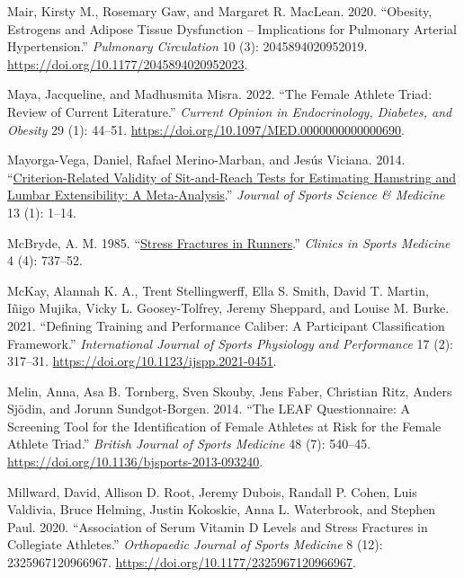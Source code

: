 \documentclass[
]{article}
\newlength{\cslhangindent}
\newenvironment{CSLReferences}[2] %
 {\begin{list}{}{%
  \setlength{\itemindent}{0pt}
  \setlength{\leftmargin}{0pt}
  \setlength{\parsep}{0pt}
  \ifodd #1
   \setlength{\leftmargin}{\cslhangindent}
   \setlength{\itemindent}{-1\cslhangindent}
  \fi
  \setlength{\itemsep}{#2\baselineskip}}}
 {\end{list}}
\begin{document}
\begin{CSLReferences}{1}{0}
Mair, Kirsty M., Rosemary Gaw, and Margaret R. MacLean. 2020. {``Obesity, Estrogens and Adipose Tissue Dysfunction -- Implications for Pulmonary Arterial Hypertension.''} \emph{Pulmonary Circulation} 10 (3): 2045894020952019. \url{https://doi.org/10.1177/2045894020952023}.

Maya, Jacqueline, and Madhusmita Misra. 2022. {``The {Female} {Athlete} {Triad}: {Review} of {Current} {Literature}.''} \emph{Current Opinion in Endocrinology, Diabetes, and Obesity} 29 (1): 44--51. \url{https://doi.org/10.1097/MED.0000000000000690}.

Mayorga-Vega, Daniel, Rafael Merino-Marban, and Jesús Viciana. 2014. {``\href{https://www.ncbi.nlm.nih.gov/pmc/articles/PMC3918544}{Criterion-{Related} {Validity} of {Sit}-and-{Reach} {Tests} for {Estimating} {Hamstring} and {Lumbar} {Extensibility}: A {Meta}-{Analysis}}.''} \emph{Journal of Sports Science \& Medicine} 13 (1): 1--14.

McBryde, A. M. 1985. {``\href{https://www.ncbi.nlm.nih.gov/pubmed/4053198}{Stress Fractures in Runners}.''} \emph{Clinics in Sports Medicine} 4 (4): 737--52.

McKay, Alannah K. A., Trent Stellingwerff, Ella S. Smith, David T. Martin, Iñigo Mujika, Vicky L. Goosey-Tolfrey, Jeremy Sheppard, and Louise M. Burke. 2021. {``Defining {Training} and {Performance} {Caliber}: {A} {Participant} {Classification} {Framework}.''} \emph{International Journal of Sports Physiology and Performance} 17 (2): 317--31. \url{https://doi.org/10.1123/ijspp.2021-0451}.

Melin, Anna, Asa B. Tornberg, Sven Skouby, Jens Faber, Christian Ritz, Anders Sjödin, and Jorunn Sundgot-Borgen. 2014. {``The {LEAF} Questionnaire: A Screening Tool for the Identification of Female Athletes at Risk for the Female Athlete Triad.''} \emph{British Journal of Sports Medicine} 48 (7): 540--45. \url{https://doi.org/10.1136/bjsports-2013-093240}.

Millward, David, Allison D. Root, Jeremy Dubois, Randall P. Cohen, Luis Valdivia, Bruce Helming, Justin Kokoskie, Anna L. Waterbrook, and Stephen Paul. 2020. {``Association of {Serum} {Vitamin} {D} {Levels} and {Stress} {Fractures} in {Collegiate} {Athletes}.''} \emph{Orthopaedic Journal of Sports Medicine} 8 (12): 2325967120966967. \url{https://doi.org/10.1177/2325967120966967}.


\end{CSLReferences}
\end{document}
